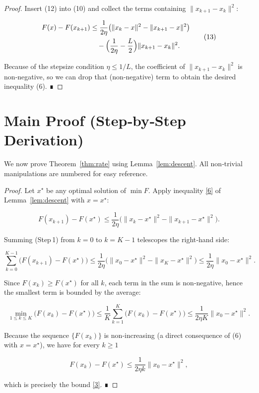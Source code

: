 \documentclass{article}
\begin{document}
\begin{proof}
Insert (12) into (10) and collect the terms containing $\|x_{k+1}-x_{k}\|^{2}$:

\[
\begin{aligned}
F(x)-F(x_{k+1})
&\le
\frac{1}{2\eta}\bigl(\|x_{k}-x\|^{2}-\|x_{k+1}-x\|^{2}\bigr)\\
&\quad-\Bigl(\frac{1}{2\eta}-\frac{L}{2}\Bigr)\|x_{k+1}-x_{k}\|^{2}.
\end{aligned}
\tag{13}
\]

Because of the stepsize condition $\eta\le 1/L$, the coefficient of
$\|x_{k+1}-x_{k}\|^{2}$ is non‑negative, so we can drop that (non‑negative)
term to obtain the desired inequality (6). ∎
\end{proof}

\section*{Main Proof (Step‑by‑Step Derivation)}
We now prove Theorem~\ref{thm:rate} using Lemma~\ref{lem:descent}.  
All non‑trivial manipulations are numbered for easy reference.

\begin{proof}
Let $x^{\star}$ be any optimal solution of $\min F$.  
Apply inequality \eqref{6} of Lemma~\ref{lem:descent} with $x=x^{\star}$:

\[
F(x_{k+1})-F(x^{\star})
\le
\frac{1}{2\eta}\bigl(\|x_{k}-x^{\star}\|^{2}
      -\|x_{k+1}-x^{\star}\|^{2}\bigr).
\tag{Step 1}
\]

Summing (Step 1) from $k=0$ to $k=K-1$ telescopes the right‑hand side:

\[
\sum_{k=0}^{K-1}\!\bigl(F(x_{k+1})-F(x^{\star})\bigr)
\le
\frac{1}{2\eta}\bigl(\|x_{0}-x^{\star}\|^{2}
      -\|x_{K}-x^{\star}\|^{2}\bigr)
\le
\frac{1}{2\eta}\|x_{0}-x^{\star}\|^{2}.
\tag{Step 2}
\]

Since $F(x_{k})\ge F(x^{\star})$ for all $k$, each term in the sum is non‑negative,
hence the smallest term is bounded by the average:

\[
\min_{1\le k\le K}\bigl(F(x_{k})-F(x^{\star})\bigr)
\le
\frac{1}{K}\sum_{k=1}^{K}\!\bigl(F(x_{k})-F(x^{\star})\bigr)
\le
\frac{1}{2\eta K}\|x_{0}-x^{\star}\|^{2}.
\tag{Step 3}
\]

Because the sequence $\{F(x_{k})\}$ is non‑increasing (a direct consequence of
(6) with $x=x^{\star}$), we have for every $k\ge 1$

\[
F(x_{k})-F(x^{\star})
\le
\frac{1}{2\eta k}\|x_{0}-x^{\star}\|^{2},
\tag{Step 4}
\]

which is precisely the bound \eqref{3}. ∎
\end{proof}
\end{document}
